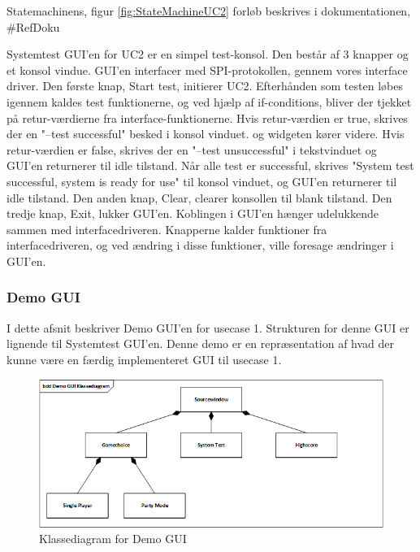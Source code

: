 Statemachinens, figur \ref{fig:StateMachineUC2} forløb beskrives i dokumentationen, \#RefDoku

Systemtest GUI'en for UC2 er en simpel test-konsol. Den består af 3 knapper og et konsol vindue. GUI'en interfacer med SPI-protokollen, gennem vores interface driver. Den første knap, Start test, initierer UC2. Efterhånden som testen løbes igennem kaldes test funktionerne, og ved hjælp af if-conditions, bliver der tjekket på retur-værdierne fra interface-funktionerne. Hvis retur-værdien er true, skrives der en "--test successful" besked i konsol vinduet. og widgeten kører videre. Hvis retur-værdien er false, skrives der en "--test unsuccessful" i tekstvinduet og GUI'en returnerer til idle tilstand. Når alle test er successful, skrives "System test successful, system is ready for use" til konsol vinduet, og GUI'en returnerer til idle tilstand. Den anden knap, Clear, clearer konsollen til blank tilstand. Den tredje knap, Exit, lukker GUI'en.
Koblingen i GUI'en hænger udelukkende sammen med interfacedriveren. Knapperne kalder funktioner fra interfacedriveren, og ved ændring i disse funktioner, ville foresage ændringer i GUI'en.

\subsubsection{Demo GUI}

I dette afsnit beskriver Demo GUI'en for usecase 1.
Strukturen for denne GUI er lignende til Systemtest GUI'en.
Denne demo er en repræsentation af hvad der kunne være en færdig implementeret
GUI til usecase 1.

\begin{figure}[H]
	\centering
	\includegraphics[width=1.2\textwidth]{Afsnit/DesignOgImplementering/images/DemoGUIClass}
	\caption{Klassediagram for Demo GUI}
	\label{fig:DemoGUIClass}
\end{figure}

